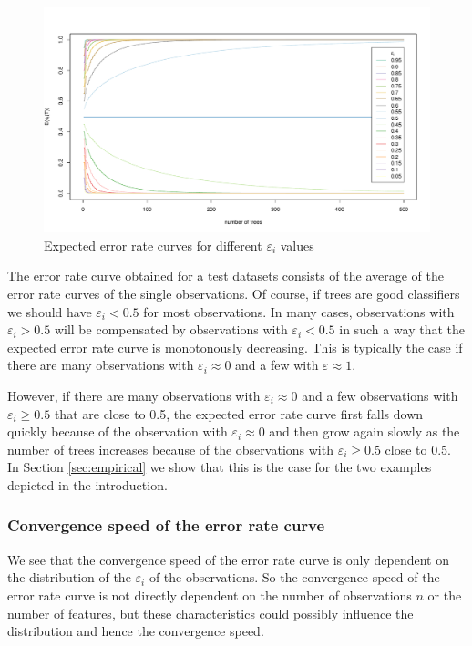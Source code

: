 \documentclass[paper=a4
               ,12pt
               ,DIV=12
               ,parskip=half
               ,titlepage=on
               ,headinclude 
               ,footinclude
               ,headsepline
               ,footsepline         %
               ,ilines 
               ]{scrartcl}
\begin{document}
\begin{figure}[!htb]
\begin{center}
  \includegraphics[width=\textwidth]{error_curves.pdf}
  \caption{Expected error rate curves for different $\varepsilon_i$ values}
  \label{fig:errorcurves}
\end{center}
\end{figure}

The error rate curve obtained for a test datasets consists of the average of the error rate curves of the single observations. Of course, if trees are good classifiers we should have $\varepsilon_i < 0.5$ for most observations. 
In many cases, observations with  $\varepsilon_i > 0.5$ will be compensated by observations with $\varepsilon_i < 0.5$ in such a way that the expected error rate curve is monotonously decreasing. 
This is typically the case if there are many observations with $\varepsilon_i\approx 0$ and a few with $\varepsilon\approx 1$.

However, if there are many observations with  $\varepsilon_i\approx 0$ and a few  observations with $\varepsilon_i \geq 0.5$ that are close to 0.5, the expected error rate curve first
falls down quickly because of the observation with $\varepsilon_i \approx 0$ and then grow again slowly as the number of trees increases because of the observations with $\varepsilon_i \geq 0.5$ close to 0.5. In Section \ref{sec:empirical}
we show that this is the case for the two examples depicted in the introduction. 

\subsubsection{Convergence speed of the error rate curve}
We see that the convergence speed of the error rate curve is only dependent on the distribution of the $\varepsilon_i$ of the observations. So the convergence speed of the error rate curve is not directly dependent 
on the number of observations $n$ or the number of features, but these characteristics could possibly influence the distribution and hence the convergence speed.  
\end{document}
